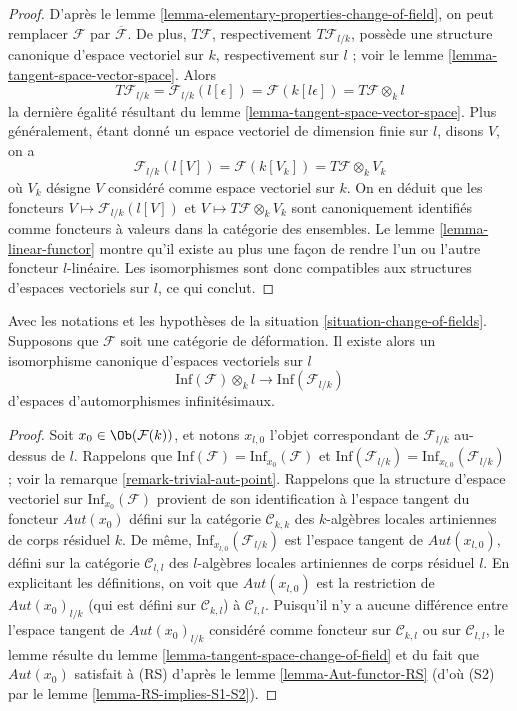 \begin{proof}
D'après le lemme \ref{lemma-elementary-properties-change-of-field}, on peut
remplacer $\mathcal{F}$ par $\overline{\mathcal{F}}$. De plus,
$T\mathcal{F}$, respectivement $T\mathcal{F}_{l/k}$, possède une structure
canonique d'espace vectoriel sur $k$, respectivement sur $l$ ; voir le lemme
\ref{lemma-tangent-space-vector-space}. Alors
$$
T\mathcal{F}_{l/k} = \mathcal{F}_{l/k}(l[\epsilon])
= \mathcal{F}(k[l\epsilon]) = T\mathcal{F} \otimes_k l
$$
la dernière égalité résultant du lemme
\ref{lemma-tangent-space-vector-space}. Plus généralement, étant donné un
espace vectoriel de dimension finie sur $l$, disons $V$, on a
$$
\mathcal{F}_{l/k}(l[V]) = \mathcal{F}(k[V_k]) = T\mathcal{F} \otimes_k V_k
$$
où $V_k$ désigne $V$ considéré comme espace vectoriel sur $k$. On en déduit
que les foncteurs $V \mapsto \mathcal{F}_{l/k}(l[V])$ et
$V \mapsto T\mathcal{F} \otimes_k V_k$ sont canoniquement identifiés comme
foncteurs à valeurs dans la catégorie des ensembles. Le lemme
\ref{lemma-linear-functor} montre qu'il existe au plus une façon de rendre l'un
ou l'autre foncteur $l$-linéaire. Les isomorphismes sont donc compatibles aux
structures d'espaces vectoriels sur $l$, ce qui conclut.
\end{proof}

\begin{lemma}
\label{lemma-inf-aut-change-of-field}
Avec les notations et les hypothèses de la situation
\ref{situation-change-of-fields}. Supposons que $\mathcal{F}$ soit une
catégorie de déformation. Il existe alors un isomorphisme canonique d'espaces
vectoriels sur $l$
$$
\text{Inf}(\mathcal{F}) \otimes_k l
\longrightarrow
\text{Inf}(\mathcal{F}_{l/k})
$$
d'espaces d'automorphismes infinitésimaux.
\end{lemma}

\begin{proof}
Soit $x_0 \in \Ob(\mathcal{F}(k))$, et notons $x_{l, 0}$ l'objet correspondant
de $\mathcal{F}_{l/k}$ au-dessus de $l$. Rappelons que
$\text{Inf}(\mathcal{F}) = \text{Inf}_{x_0}(\mathcal{F})$ et
$\text{Inf}(\mathcal{F}_{l/k}) = \text{Inf}_{x_{l, 0}}(\mathcal{F}_{l/k})$ ;
voir la remarque \ref{remark-trivial-aut-point}. Rappelons que la structure
d'espace vectoriel sur $\text{Inf}_{x_0}(\mathcal{F})$ provient de son
identification à l'espace tangent du foncteur $\mathit{Aut}(x_0)$ défini sur la
catégorie $\mathcal{C}_{k, k}$ des $k$-algèbres locales artiniennes de corps
résiduel $k$. De même, $\text{Inf}_{x_{l, 0}}(\mathcal{F}_{l/k})$ est l'espace
tangent de $\mathit{Aut}(x_{l, 0})$, défini sur la catégorie
$\mathcal{C}_{l, l}$ des $l$-algèbres locales artiniennes de corps résiduel
$l$. En explicitant les définitions, on voit que $\mathit{Aut}(x_{l, 0})$ est
la restriction de $\mathit{Aut}(x_0)_{l/k}$ (qui est défini sur
$\mathcal{C}_{k, l}$) à $\mathcal{C}_{l, l}$. Puisqu'il n'y a aucune
différence entre l'espace tangent de $\mathit{Aut}(x_0)_{l/k}$ considéré comme
foncteur sur $\mathcal{C}_{k, l}$ ou sur $\mathcal{C}_{l, l}$, le lemme résulte
du lemme \ref{lemma-tangent-space-change-of-field} et du fait que
$\mathit{Aut}(x_0)$ satisfait à (RS) d'après le lemme
\ref{lemma-Aut-functor-RS} (d'où (S2) par le lemme
\ref{lemma-RS-implies-S1-S2}).
\end{proof}

